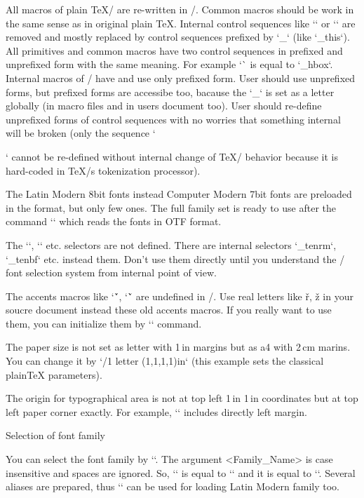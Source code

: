 All macros of plain \TeX/ are re-written in \OpTeX/. Common macros should be
work in the same sense as in original plain \TeX. Internal control sequences
\new 
like `\p@` or `\f@@t` are removed and mostly replaced by control sequences
prefixed by `_` (like `\_this`). All primitives and common macros have two
control sequences in prefixed and unprefixed form with the same
meaning. For example `\hbox` is equal to `\_hbox`. 
Internal macros of \OpTeX/ have and use only prefixed form. User should use
unprefixed forms, but prefixed forms are accessibe too, bacause the `_` is
set as a letter globally (in macro files and in users document too). User
should re-define unprefixed forms of control sequences with no worries that
something internal will be broken (only the sequence `\par` cannot be
re-defined without internal change of \TeX/ behavior because it is
hard-coded in \TeX/s tokenization processor).

\new
The Latin Modern 8bit fonts instead Computer Modern 7bit fonts are
preloaded in the format, but only few ones. The full family set is ready to
use after the command `\fontfam[LMfonts]` which reads the fonts in OTF
format.

\new
The `\tenrm`, `\tenbf` etc. selectors are not defined. There are internal
selectors `\_tenrm`, `\_tenbf` etc. instead them. Don't use them directly
until you understand the \OpTeX/ font selection system from
internal point of view.

\new
The accents macros like `\'`, `\v` are undefined in \OpTeX/. Use real
letters like ř, ž in your soucre document instead these old accents macros.
If you really want to use them, you can initialize them by `\oldaccents`
command.

\new
The paper size is not set as letter with 1\,in margins but as a4 with 2\,cm
marins. You can change it by `\margins/1 letter (1,1,1,1)in` (this example 
sets the classical plainTeX parameters).

\new
The origin for typographical area is not at top left 1\,in 1\,in coordinates
but at top left paper corner exactly. For example, `\hoffset` includes directly left
margin.


\sec Selection of font family

You can select the font family by ``.
The argument <Family_Name> is case insensitive and spaces are ignored. So,
`\fontfam[LM Fonts]` is equal to `\fontfam[LMfonts]` and it is equal
to `\fontfam[lmfonts]`. Several aliases are prepared, thus 
`` can be used for loading Latin Modern family too.


